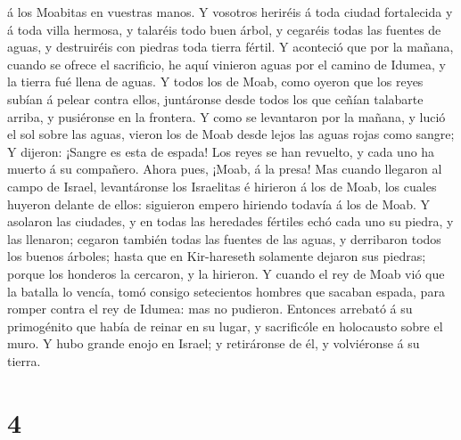 á los Moabitas en vuestras manos.  Y vosotros heriréis á
toda ciudad fortalecida y á toda villa hermosa, y talaréis todo buen
árbol, y cegaréis todas las fuentes de aguas, y destruiréis con piedras
toda tierra fértil.  Y aconteció que por la mañana, cuando
se ofrece el sacrificio, he aquí vinieron aguas por el camino de Idumea,
y la tierra fué llena de aguas.  Y todos los de Moab, como
oyeron que los reyes subían á pelear contra ellos, juntáronse desde
todos los que ceñían talabarte arriba, y pusiéronse en la frontera.
 Y como se levantaron por la mañana, y lució el sol sobre
las aguas, vieron los de Moab desde lejos las aguas rojas como sangre;
 Y dijeron: ¡Sangre es esta de espada! Los reyes se han
revuelto, y cada uno ha muerto á su compañero. Ahora pues, ¡Moab, á la
presa!  Mas cuando llegaron al campo de Israel,
levantáronse los Israelitas é hirieron á los de Moab, los cuales huyeron
delante de ellos: siguieron empero hiriendo todavía á los de Moab.
 Y asolaron las ciudades, y en todas las heredades fértiles
echó cada uno su piedra, y las llenaron; cegaron también todas las
fuentes de las aguas, y derribaron todos los buenos árboles; hasta que
en Kir-hareseth solamente dejaron sus piedras; porque los honderos la
cercaron, y la hirieron.  Y cuando el rey de Moab vió que
la batalla lo vencía, tomó consigo setecientos hombres que sacaban
espada, para romper contra el rey de Idumea: mas no pudieron.
 Entonces arrebató á su primogénito que había de reinar en
su lugar, y sacrificóle en holocausto sobre el muro. Y hubo grande enojo
en Israel; y retiráronse de él, y volviéronse á su tierra.

\hypertarget{section-3}{%
\section{4}\label{section-3}}

